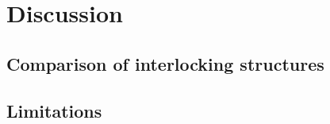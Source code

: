 \section{Discussion}


\subsection{Comparison of interlocking structures}

\subsection{Limitations}



